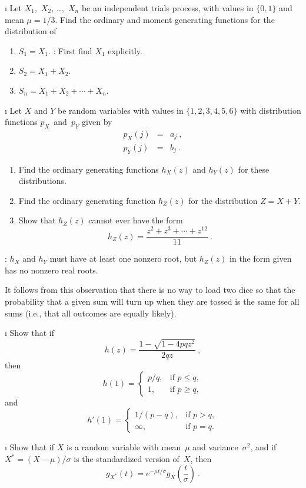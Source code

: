 \begin{LJSItem}
\i\label{exer 10.1.8} Let $X_1$,~$X_2$, \ldots,~$X_n$ be an independent trials 
process, with values in $\{0,1\}$ and mean $\mu = 1/3$.  Find the ordinary and 
moment generating functions for the distribution of
\begin{enumerate}
\item $S_1 = X_1$. : First find $X_1$ explicitly.

\item $S_2 = X_1 + X_2$.

\item $S_n = X_1 + X_2 +\cdots+ X_n$.
\end{enumerate}

\i\label{exer 10.1.9} Let $X$ and $Y$ be random variables with values in 
$\{1,2,3,4,5,6\}$ with distribution functions $p_X$~and~$p_Y$ given by
\begin{eqnarray*}
p_X(j) &=& a_j\ , \\
p_Y(j) &=& b_j\ .
\end{eqnarray*} 
\begin{enumerate}
\item Find the ordinary generating functions $h_X(z)$ and $h_Y(z)$ for these
distributions.

\item Find the ordinary generating function $h_Z(z)$ for the distribution $Z = X
+ Y$.

\item Show that $h_Z(z)$ cannot ever have the form
$$
h_Z(z) = \frac{z^2 + z^3 +\cdots+ z^{12}}{11}\ .
$$
\end{enumerate}
\noindent {}: $h_X$ and $h_Y$ must have at least one nonzero root, but 
$h_Z(z)$ in the form given has no nonzero real roots.

It follows from this observation that there is no way to load two dice so that
the probability that a given sum will turn up when they are tossed is the same
for all sums (i.e., that all outcomes are equally likely).

\i\label{exer 10.1.10} Show that if
$$
h(z) = \frac{1 - \sqrt{1 - 4pqz^2}}{2qz}\ ,
$$
then
$$
 h(1) = \left \{ \begin{array}{ll}
               p/q, &  \mbox{if $p \leq q,$}  \\
                 1, &  \mbox{if $p \geq q,$} \end{array}\right.
$$
and
$$
 h'(1) = \left \{ \begin{array}{ll}
                1/(p - q), &  \mbox{if $p > q,$}\\
                   \infty, &  \mbox{if $p = q.$} \end{array}\right.
$$

\i\label{exer 10.1.14} Show that if $X$ is a random variable with mean~$\mu$
and variance~$\sigma^2$, and if $X^* = (X - \mu)/\sigma$ is the standardized
version of~$X$, then
$$
g_{X^*}(t) = e^{-\mu t/\sigma} g_X\left( \frac t\sigma \right)\ .
$$
\end{LJSItem}

